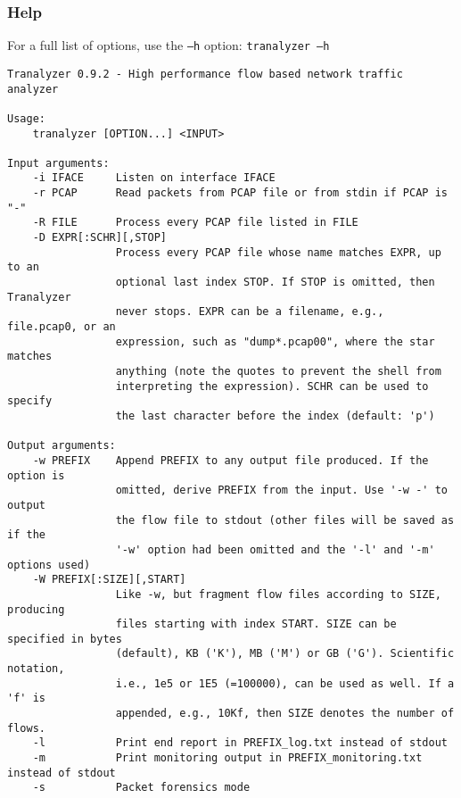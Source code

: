 
\subsubsection{Help}
For a full list of options, use the {\tt --h} option: {\tt tranalyzer --h}

\begin{verbatim}
Tranalyzer 0.9.2 - High performance flow based network traffic analyzer

Usage:
    tranalyzer [OPTION...] <INPUT>

Input arguments:
    -i IFACE     Listen on interface IFACE
    -r PCAP      Read packets from PCAP file or from stdin if PCAP is "-"
    -R FILE      Process every PCAP file listed in FILE
    -D EXPR[:SCHR][,STOP]
                 Process every PCAP file whose name matches EXPR, up to an
                 optional last index STOP. If STOP is omitted, then Tranalyzer
                 never stops. EXPR can be a filename, e.g., file.pcap0, or an
                 expression, such as "dump*.pcap00", where the star matches
                 anything (note the quotes to prevent the shell from
                 interpreting the expression). SCHR can be used to specify
                 the last character before the index (default: 'p')

Output arguments:
    -w PREFIX    Append PREFIX to any output file produced. If the option is
                 omitted, derive PREFIX from the input. Use '-w -' to output
                 the flow file to stdout (other files will be saved as if the
                 '-w' option had been omitted and the '-l' and '-m' options used)
    -W PREFIX[:SIZE][,START]
                 Like -w, but fragment flow files according to SIZE, producing
                 files starting with index START. SIZE can be specified in bytes
                 (default), KB ('K'), MB ('M') or GB ('G'). Scientific notation,
                 i.e., 1e5 or 1E5 (=100000), can be used as well. If a 'f' is
                 appended, e.g., 10Kf, then SIZE denotes the number of flows.
    -l           Print end report in PREFIX_log.txt instead of stdout
    -m           Print monitoring output in PREFIX_monitoring.txt instead of stdout
    -s           Packet forensics mode


\end{verbatim}

